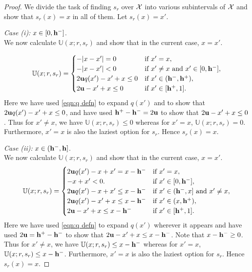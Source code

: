 \begin{proof}\label{proof:error is half}
    We divide the task of finding $ s_r $ over $ \mathcal{X} $ into various subintervals of $ \mathcal{X} $ and show that $s_r(x) = x$ in all of them.  Let $s_r(x) = x'$.

    \noindent \textit{Case (i): } $x \in [0,\mathbf{h^{-}}]$.\\
 We now calculate $\mathbb{U}(x;r,s_r)$ and show that in the current case, $x=x'$.

\begin{equation*}
    \mathbb{U}(x;r,s_r) = \begin{cases}
    -|x-x'| = 0 &\text{if } x'= x,\\
    -|x-x'| < 0 &\text{if } x'\neq x \text{ and } x' \in [0,\mathbf{h^{-}}],\\
    2\mathbf{u} q(x') - x' + x \leq 0 &\text{if } x' \in (\mathbf{h^{-}},\mathbf{h^{+}}),\\
    2\mathbf{u} - x' + x \leq 0&\text{if } x' \in [\mathbf{h^{+}},1].
    \end{cases}
\end{equation*}
Here we have used \eqref{eqn:q defn} to expand $q(x')$ and to show that  $2\mathbf{u} q(x') - x' + x \leq 0$, and have used $\mathbf{h^{+}} - \mathbf{h^{-}} = 2\mathbf{u}$ to show that $2\mathbf{u} -x' + x \leq 0$.
Thus for $x' \neq x$, we have $\mathbb{U}(x;r,s_r) \leq 0$ whereas for $x' = x$, $\mathbb{U}(x;r,s_r) = 0$. Furthermore, $x'=x$ is also the laziest option for $s_r$. Hence $s_r(x) = x$.

\noindent \textit{Case (ii): } $x \in (\mathbf{h^{-}},\mathbf{h}]$.\\
 We now calculate $\mathbb{U}(x;r,s_r)$ and show that in the current case, $x=x'$.
 \begin{equation*}
    \mathbb{U}(x;r,s_r) = \begin{cases}
    2\mathbf{u} q(x') - x + x' = x - \mathbf{h^{-}} &\text{if } x'= x,\\
    -x + x' < 0. &\text{if } x' \in [0,\mathbf{h^{-}}],\\
    2\mathbf{u} q(x') - x + x' \leq x- \mathbf{h^{-}} &\text{if } x' \in (\mathbf{h^{-}},x] \text{ and } x' \neq x,\\
    2\mathbf{u} q(x') - x' + x \le x-\mathbf{h^{-}}    &\text{if } x' \in (x,\mathbf{h^{+}}),\\
    2\mathbf{u} - x' + x \leq x - \mathbf{h^{-}} &\text{if } x' \in [\mathbf{h^{+}},1].
    \end{cases}
\end{equation*}
Here we have used \eqref{eqn:q defn} to expand $q(x')$ wherever it appears and have used $2\mathbf{u} = \mathbf{h^{+}} - \mathbf{h^{-}}$ to show that $2\mathbf{u} -x' + x \leq x - \mathbf{h^{-}}$. Note that $x - \mathbf{h^{-}} \geq 0$.
Thus for $x' \neq x$, we have $\mathbb{U}(x;r,s_r) \leq x-\mathbf{h^{-}}$ whereas for $x' = x$, $\mathbb{U}(x;r,s_r) \leq x - \mathbf{h^{-}}$. Furthermore, $x'=x$ is also the laziest option for $s_r$. Hence $s_r(x) = x$.


\end{proof}
